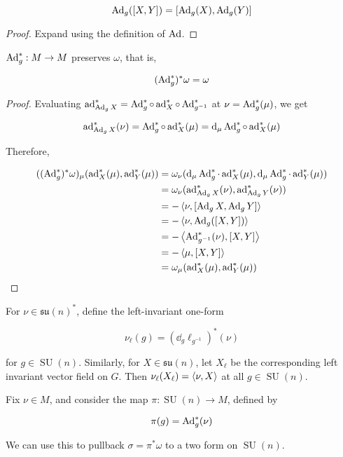 \documentclass{article}
\DeclareMathOperator{\SU}{SU}
\newcommand{\su}{\mathfrak{su}}
\begin{document}
\begin{lemma}
    \[\operatorname{Ad}_g([X, Y]) = [\operatorname{Ad}_g(X), \operatorname{Ad}_g(Y)]\]
\end{lemma}

\begin{proof}
    Expand using the definition of \(\operatorname{Ad}\).
\end{proof}

\begin{lemma}
    \(\operatorname{Ad}_g^* :  M \to  M\) preserves \(\omega\), that is,

    \[(\operatorname{Ad}_g^*)^*\omega = \omega\]
\end{lemma}

\begin{proof}
    Evaluating \(\operatorname{ad}^*_{\operatorname{Ad}_gX} = \operatorname{Ad}_g^* \circ \operatorname{ad}_X^* \circ \operatorname{Ad}_{g^{-1}}^*\) at \(\nu = \operatorname{Ad}_g^*(\mu)\), we get

    \[\operatorname{ad}^*_{\operatorname{Ad}_gX}(\nu) = \operatorname{Ad}_g^* \circ \operatorname{ad}_X^*(\mu) = \dd_\mu\operatorname{Ad}_g^* \circ \operatorname{ad}_X^*(\mu)\]

    Therefore,

    \begin{align*}
        ((\operatorname{Ad}_g^*)^*\omega)_\mu(\operatorname{ad}_X^*(\mu), \operatorname{ad}_Y^*(\mu)) &= \omega_\nu(\dd_\mu \operatorname{Ad}_g^* \cdot \operatorname{ad}_X^*(\mu), \dd_\mu \operatorname{Ad}_g^* \cdot \operatorname{ad}_Y^*(\mu)) \\
        &= \omega_\nu(\operatorname{ad}^*_{\operatorname{Ad}_gX}(\nu), \operatorname{ad}^*_{\operatorname{Ad}_gY}(\nu)) \\
        &= -\left\langle \nu, [\operatorname{Ad}_gX, \operatorname{Ad}_gY] \right\rangle \\
        &= -\left\langle \nu, \operatorname{Ad}_g([X, Y]) \right\rangle \\
        &= -\left\langle \operatorname{Ad}_{g^{-1}}^*(\nu), [X, Y] \right\rangle \\
        &= -\left\langle \mu, [X, Y] \right\rangle \\
        &= \omega_\mu(\operatorname{ad}_X^*(\mu), \operatorname{ad}_Y^*(\mu))
    \end{align*}
\end{proof}

For \(\nu \in \su(n)^*\), define the left-invariant one-form

\[\nu_\ell(g) = (\dd_g\ell_{g^{-1}})^*(\nu)\]

for \(g \in \SU(n)\). Similarly, for \(X \in \su(n)\), let \(X_\ell\) be the corresponding left invariant vector field on \(G\). Then \(\nu_\ell(X_\ell) = \left\langle \nu, X \right\rangle\) at all \(g \in \SU(n)\).

Fix \(\nu \in  M\), and consider the map \(\pi : \SU(n) \to  M\), defined by

\[\pi(g) = \operatorname{Ad}_g^*(\nu)\]

We can use this to pullback \(\sigma = \pi^*\omega\) to a two form on \(\SU(n)\).
\end{document}
